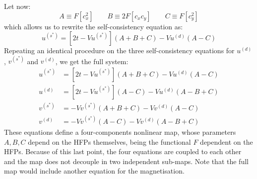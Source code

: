 Let now:
\begin{equation}\label{appeq:saf-ABC-def}
	A \equiv F\left[c_x^2\right]
	\qquad
	B \equiv 2F\left[c_x c_y\right]
	\qquad
	C \equiv F\left[c_y^2\right]
\end{equation}
which allows us to rewrite the self-consistency equation as:
\[
u^{(s^*)} =
\left[2t - Vu^{(s^*)}\right] (A+B+C) -  Vu^{(d)} (A-C)
\]
Repeating an identical procedure on the three self-consistency equations for $u^{(d)}$, $v^{(s^*)}$ and $v^{(d)}$, we get the full system:
\begin{align}
	u^{(s^*)} &=
	\left[2t - Vu^{(s^*)}\right] (A+B+C) -  Vu^{(d)} (A-C) \label{appeq:saf-uS-sc-ABC} \\
	u^{(d)} &=
	\left[2t - Vu^{(s^*)}\right] (A-C) -  Vu^{(d)} (A-B+C) \label{appeq:saf-ud-sc-ABC} \\
	v^{(s^*)} &=
	- Vv^{(s^*)} (A+B+C) -  Vv^{(d)} (A-C) \label{appeq:saf-vS-sc-ABC} \\
	v^{(d)} &=
	- Vv^{(s^*)} (A-C) -  Vv^{(d)} (A-B+C) \label{appeq:saf-vd-sc-ABC}
\end{align}
These equations define a four-components nonlinear map, whose parameters $A,B,C$ depend on the HFPs themselves, being the functional $F$ dependent on the HFPs. Because of this last point, the four equations are coupled to each other and the map does not decouple in two independent sub-maps. Note that the full map would include another equation for the magnetisation.

